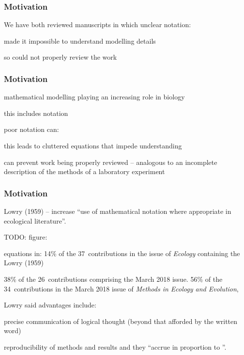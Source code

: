 
\begin{frame}
\frametitle{Motivation}

We have both reviewed manuscripts in which unclear notation:
\bi
\item made it impossible to understand modelling details
\item {}
\item so could not properly review the work
\ei

\end{frame}



\begin{frame}
\frametitle{Motivation}
\bi
\item mathematical modelling playing an increasing role in biology
\item {}
\item this includes notation
\item {}
\pause
\item poor notation can:
  \bi
  \item {}
  \item this leads to cluttered equations that impede understanding
  \item {}
  \item can prevent work being properly reviewed -- analogous to an
      incomplete description of the methods of a laboratory experiment
  \ei
\ei
\end{frame}


\begin{frame}
\frametitle{Motivation}
Lowry (1959) -- increase ``use of mathematical notation
where appropriate in ecological literature''.

TODO: figure:

equations in:
 14\% of the 37~contributions in the issue of \emph{Ecology} containing the
 Lowry (1959)

38\% of the 26~contributions comprising the March 2018 issue.
56\% of the 34~contributions in the March 2018 issue of \emph{Methods in Ecology and Evolution},

Lowry said advantages include:
\bi
\item precise communication of logical thought (beyond that afforded by
  the written word)
\item reproducibility of methods and results
\ei
and they ``accrue in proportion to
''.
\end{frame}

